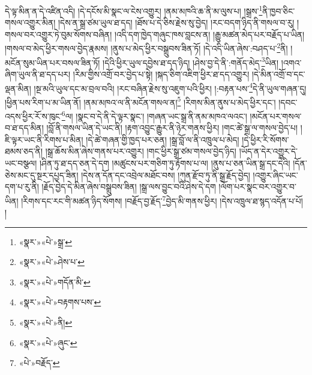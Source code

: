 དེ་ལྟ་མིན་ན་དེ་འཛིན་འདི། །དེ་དངོས་མི་སྣང་ལ་ངེས་འགྱུར། །ནམ་མཁའི་ཆ་ནི་མ་ལུས་པ། །སྒྲས་\footnote{«སྣར་»«པེ་»སྒྲ་}ནི་ཁྱབ་ཅིང་གསལ་འགྱུར་མིན། །དེས་ན་སྒྲ་ཙམ་ཡུལ་ཐ་དད། །ཐོས་པ་དེ་ཅིས་རྗེས་སུ་བྱེད། །རང་བདག་ཉིད་ནི་གསལ་བ་རུ། །གསལ་བར་འགྱུར་ཏེ་བུམ་སོགས་བཞིན། །འདི་དག་ཁྱེད་གཞུང་ཁས་བླངས་ན། །རྒྱུ་མཚན་མེད་པར་བརྗོད་པ་ཡིན། །གསལ་བ་མེད་ཕྱིར་གསལ་བྱེད་རྣམས། །ནུས་པ་མེད་ཕྱིར་བསྒྲུབས་ཟིན་ཏོ། །དེ་འདི་ཡིན་ཞེས་:བཤད་པ་\footnote{«སྣར་»«པེ་»ཤེས་པ་}ནི། །མངོན་སུམ་ཡིན་པར་བསལ་ཟིན་ཏོ། །དེའི་ཕྱིར་ཡུལ་དབྱེས་ཐ་དད་ཉིད། །ཤེས་བྱ་དེ་ནི་:གནོད་མེད་\footnote{«སྣར་»«པེ་»གདོན་མི་}ཡིན། །འགའ་ཞིག་ཡུལ་ནི་ཐ་དད་པར། །རིམ་གྱིས་འགྲོ་བར་བྱེད་པ་སྟེ། །སྐད་ཅིག་འཇིག་ཕྱིར་ཐ་དད་འགྱུར། །དེ་མིན་འགྲོ་བ་དང་ལྡན་མིན། །སྔ་མའི་ཡུལ་དང་མ་བྲལ་བའི། །རང་བཞིན་རྗེས་སུ་འཇུག་པའི་ཕྱིར། །:བརྟན་པས་\footnote{«སྣར་»«པེ་»བརྟགས་པས་}དེ་ནི་ཡུལ་གཞན་དུ། །ཕྱིན་པས་རིག་པ་མ་ཡིན་ནོ། །ནམ་མཁའ་ལ་ནི་མངོན་གསལ་ན།\footnote{«སྣར་»«པེ་»ནི།} །རིགས་མིན་ནུས་པ་མེད་ཕྱིར་དང་། །དབང་འདས་ཕྱིར་རོ་ས་ཁུང་\footnote{«སྣར་»«པེ་»ཞུང་}ལ། །སྣང་བ་དེ་ནི་དེ་ལྟར་སྣང་། །གཞན་ཡང་སྒྲ་ནི་ནམ་མཁའ་ལའང་། །མངོན་པར་གསལ་བ་ཐ་དད་མིན། །བློ་ནི་གསལ་ཡིན་དེ་ཡང་ནི། །རྟག་འབྱུང་རྒྱུར་ནི་ཉེར་གནས་ཕྱིར། །གང་ཚེ་སྒྲ་ལ་གསལ་བྱེད་པ། །ཇི་ལྟར་ཡང་ནི་རིགས་པ་མིན། །དེ་ཚེ་གཞན་གྱི་ཁྱད་པར་ཅན། །སྒྲ་བློ་ལ་ནི་འཁྲུལ་པ་མེད། །དེ་ཕྱིར་རི་སོགས་ཐམས་ཅད་ནི། །སྒྲ་ཆོས་མིན་ཞེས་གནས་པར་འགྱུར། །གང་ཕྱིར་སྒྲ་ཙམ་གསལ་བྱེད་ཉིད། །ཡོད་ན་དེར་འགྱུར་དེ་ཡང་བསྩལ། །ཤིན་ཏུ་ཐ་དད་ཅན་དེ་དག །མཚུངས་པར་གཅིག་ཏུ་རྟོགས་པ་ལ། །ནུས་པ་ཅན་ཡིན་སྒྲ་དང་དེའི། །དོན་ཅེས་མང་དུ་སྔར་དཔྱད་ཟིན། །དེས་ན་དོན་དང་འབྲེལ་མཐོང་བས། །ཀུན་རྫོབ་ཏུ་ནི་སྒྲ་རྗོད་བྱེད། །འགྱུར་ཞིང་ཡང་དག་པ་རུ་ནི། །རྗོད་བྱེད་དེ་མིན་ཞེས་བསྒྲུབས་ཟིན། །སྒྲ་ལས་བྱུང་བའི་ཤེས་དེ་དག །ལོག་པར་སྣང་བར་འགྱུར་བ་ཡིན། །རིགས་དང་རང་གི་མཚན་ཉིད་སོགས། །བརྗོད་བྱ་རྗོད་\footnote{«པེ་»བརྗོད་}བྱེད་མི་གནས་ཕྱིར། །དེས་འཁྲུལ་ཐ་སྙད་འདོན་པ་པོ། །
